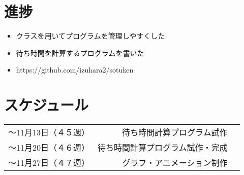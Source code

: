 \documentclass[a4j,10pt]{ltjsarticle}
\begin{document}
\section{進捗}
\begin{itemize}
\item{クラスを用いてプログラムを管理しやすくした}
\item{待ち時間を計算するプログラムを書いた}
\item{https://github.com/izuhara2/sotuken}
\end{itemize}

\section{スケジュール}
\begin{center}
 \begin{tabular}{lrr}
   〜11月13日（４５週） &待ち時間計算プログラム試作\\
   〜11月20日（４６週） &待ち時間計算プログラム試作・完成 \\
   〜11月27日（４７週）&  グラフ・アニメーション制作
 \end{tabular}
\end{center}
\end{document}
